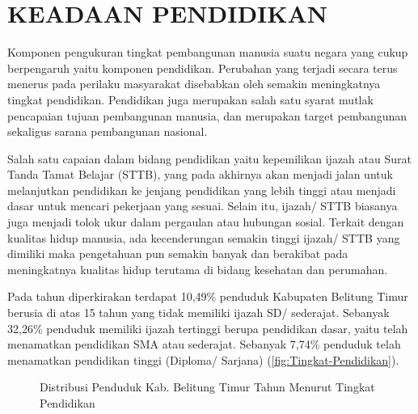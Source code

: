 \section{KEADAAN PENDIDIKAN}
Komponen pengukuran tingkat pembangunan manusia suatu negara yang
cukup berpengaruh yaitu komponen pendidikan. Perubahan yang terjadi
secara terus menerus pada perilaku masyarakat disebabkan oleh semakin
meningkatnya tingkat pendidikan. Pendidikan juga merupakan salah satu
syarat mutlak pencapaian tujuan pembangunan manusia, dan merupakan
target pembangunan sekaligus sarana pembangunan nasional.

Salah satu capaian dalam bidang pendidikan yaitu kepemilikan ijazah
atau Surat Tanda Tamat Belajar (STTB), yang pada akhirnya akan menjadi
jalan untuk melanjutkan pendidikan ke jenjang pendidikan yang lebih
tinggi atau menjadi dasar untuk mencari pekerjaan yang sesuai. Selain
itu, ijazah/ STTB biasanya juga menjadi tolok ukur dalam pergaulan
atau hubungan sosial. Terkait dengan kualitas hidup manusia, ada kecenderungan semakin tinggi
ijazah/ STTB yang dimiliki maka pengetahuan pun semakin banyak dan
berakibat pada meningkatnya kualitas hidup terutama di bidang kesehatan
dan perumahan.

Pada tahun \tP diperkirakan terdapat 10,49\% penduduk Kabupaten Belitung Timur berusia di atas 15 tahun yang tidak memiliki ijazah SD/ sederajat. Sebanyak 32,26\% penduduk memiliki ijazah tertinggi berupa pendidikan dasar, yaitu telah menamatkan pendidikan SMA atau sederajat. Sebanyak 7,74\% penduduk telah menamatkan pendidikan tinggi (Diploma/ Sarjana) (\autoref{fig:Tingkat-Pendidikan}).

\begin{figure}[H]
    \centering
    \caption{Distribusi Penduduk Kab. Belitung Timur Tahun \tP Menurut Tingkat Pendidikan}
    \label{fig:Tingkat-Pendidikan}
\end{figure}
